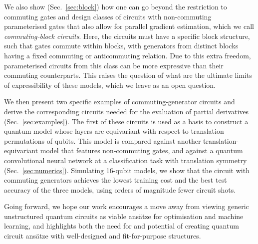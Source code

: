 \documentclass[a4paper,twocolumn,11pt,accepted=2025-09-06]{quantumarticle}
\begin{document}
We also show (Sec.\ \ref{sec:block}) how one can go beyond the restriction to commuting gates and design classes of circuits with non-commuting parameterised gates that also allow for parallel gradient estimation, which we call \emph{commuting-block circuits}. Here, the circuits must have a specific block structure, such that gates commute within blocks, with generators from distinct blocks having a fixed commuting or anticommuting relation. Due to this extra freedom, parameterised circuits from this class can be more expressive than their commuting counterparts. This raises the question of what are the ultimate limits of expressibility of these models, which we leave as an open question.  

We then present two specific examples of commuting-generator circuits and derive the corresponding circuits needed for the evaluation of partial derivatives (Sec.\ \ref{sec:examples}). The first of these circuits is used as a basis to construct a quantum model whose layers are equivariant with respect to translation permutations of qubits. This model is compared against another translation-equivariant model that features non-commuting gates, and against a quantum convolutional neural network at a classification task with translation symmetry (Sec.\ \ref{sec:numerics}). Simulating 16-qubit models, we show that the circuit with commuting generators achieves the lowest training cost and the best test accuracy of the three models, using orders of magnitude fewer circuit shots. 

Going forward, we hope our work encourages a move away from viewing generic unstructured quantum circuits as viable ans\"atze for optimisation and machine learning, and highlights both the need for and potential of creating quantum circuit ans\"atze with well-designed and fit-for-purpose structures. 
\end{document}
